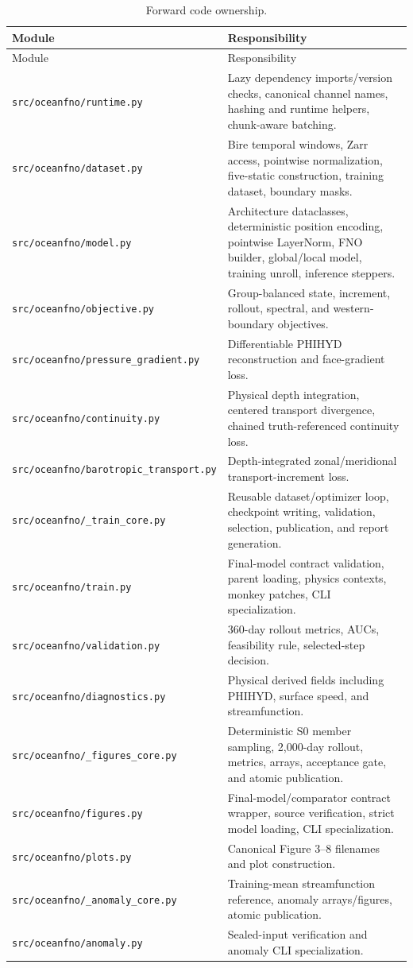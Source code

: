 \documentclass[11pt,oneside]{report}
\newcommand{\repo}[1]{\nolinkurl{#1}}
\begin{document}
\begin{longtable}{@{}p{}p{}@{}}
\caption{Forward code ownership.}
\label{tab:modules}\\
\toprule
Module & Responsibility \\
\midrule
\endfirsthead
\toprule
Module & Responsibility \\
\midrule
\endhead
\repo{src/oceanfno/runtime.py} &
Lazy dependency imports/version checks, canonical channel names, hashing and
runtime helpers, chunk-aware batching. \\
\repo{src/oceanfno/dataset.py} &
Bire temporal windows, Zarr access, pointwise normalization, five-static
construction, training dataset, boundary masks. \\
\repo{src/oceanfno/model.py} &
Architecture dataclasses, deterministic position encoding, pointwise
LayerNorm, FNO builder, global/local model, training unroll, inference
steppers. \\
\repo{src/oceanfno/objective.py} &
Group-balanced state, increment, rollout, spectral, and western-boundary
objectives. \\
\repo{src/oceanfno/pressure_gradient.py} &
Differentiable PHIHYD reconstruction and face-gradient loss. \\
\repo{src/oceanfno/continuity.py} &
Physical depth integration, centered transport divergence, chained
truth-referenced continuity loss. \\
\repo{src/oceanfno/barotropic_transport.py} &
Depth-integrated zonal/meridional transport-increment loss. \\
\repo{src/oceanfno/_train_core.py} &
Reusable dataset/optimizer loop, checkpoint writing, validation, selection,
publication, and report generation. \\
\repo{src/oceanfno/train.py} &
Final-model contract validation, parent loading, physics contexts, monkey
patches, CLI specialization. \\
\repo{src/oceanfno/validation.py} &
360-day rollout metrics, AUCs, feasibility rule, selected-step decision. \\
\repo{src/oceanfno/diagnostics.py} &
Physical derived fields including PHIHYD, surface speed, and streamfunction. \\
\repo{src/oceanfno/_figures_core.py} &
Deterministic S0 member sampling, 2,000-day rollout, metrics, arrays,
acceptance gate, and atomic publication. \\
\repo{src/oceanfno/figures.py} &
Final-model/comparator contract wrapper, source verification, strict model
loading, CLI specialization. \\
\repo{src/oceanfno/plots.py} &
Canonical Figure 3--8 filenames and plot construction. \\
\repo{src/oceanfno/_anomaly_core.py} &
Training-mean streamfunction reference, anomaly arrays/figures, atomic
publication. \\
\repo{src/oceanfno/anomaly.py} &
Sealed-input verification and anomaly CLI specialization. \\
\bottomrule
\end{longtable}
\end{document}
